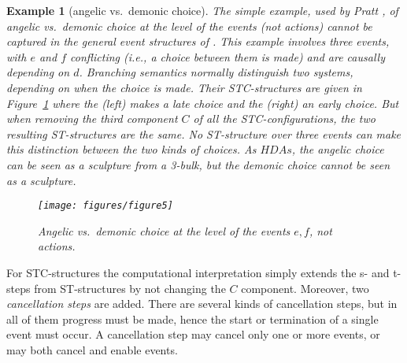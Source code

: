 \documentclass[submission,copyright,creativecommons]{eptcs}
\newtheorem{example}[theorem]{Example}
\newcommand\HDAs{\ensuremath{\mathit{HDAs}}}
\begin{document}
\begin{example}[angelic vs.\ demonic choice]\label{ex_agelicdemon}
The simple example, used by Pratt \cite[sec.3.3]{Pratt03trans_cancel}, of angelic vs.\ demonic choice at the level of the events (not actions) cannot be captured in the general event structures of \cite{GlabbeekP09configStruct}. 
This example involves three events, with $e$ and $f$ conflicting (i.e., a choice between them is made) and are causally depending on $d$. Branching semantics normally distinguish two systems, depending on when the choice is made. Their STC-structures are given in Figure~\ref{fig_ex_angelicdemonic} where the (left) makes a late choice and the (right) an early choice. But when removing the third component $C$ of all the STC-configurations, the two resulting ST-structures are the same. No ST-structure over three events can make this distinction between the two kinds of choices.
As \HDAs, the angelic choice can be seen as a sculpture from a 3-bulk, but the demonic choice cannot be seen as a sculpture.
\begin{figure}[tp]
  \begin{center}
    \hspace{-2ex}\texttt{[image: figures/figure5]}
  \end{center}
\caption{Angelic vs.\ demonic choice at the level of the events $e,f$, not actions.}
\label{fig_ex_angelicdemonic}
\end{figure}
\end{example}



For STC-structures the computational interpretation simply extends the s- and t-steps from ST-structures by not changing the $C$ component. Moreover, two \textit{cancellation steps} are added. There are several kinds of cancellation steps, but in all of them progress must be made, hence the start or termination of a single event must occur. A cancellation step may cancel only one or more events, or may both cancel and enable events.
\end{document}
